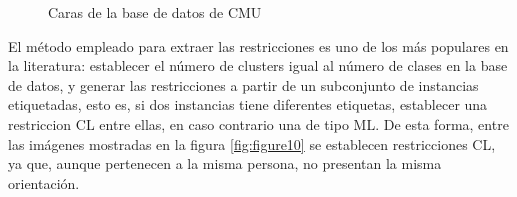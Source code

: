 \begin{figure}[bth]
	\myfloatalign
	 \quad
	 \quad
	 \quad
	\caption{Caras de la base de datos de  \ac{CMU} \cite{Survey:2007}}\label{fig:figure9}
\end{figure}

El método empleado para extraer las restricciones es uno de los más populares en la literatura: establecer el número de clusters igual al número de clases en la base de datos, y generar las restricciones a partir de un subconjunto de instancias etiquetadas, esto es, si dos instancias tiene diferentes etiquetas, establecer una restriccion \acf{CL} entre ellas, en caso contrario una de tipo \acf{ML}. De esta forma, entre las imágenes mostradas en la figura \ref{fig:figure10} se establecen restricciones \acf{CL}, ya que, aunque pertenecen a la misma persona, no presentan la misma orientación.

